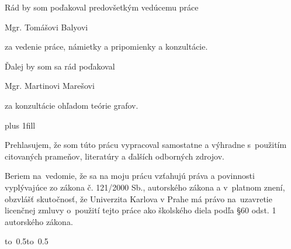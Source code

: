 \documentclass[12pt,a4paper]{report}
\let\openright=\clearpage
\begin{document}
\openright

\noindent

\begin{center}

\vspace{50mm}
Rád by som poďakoval predovšetkým vedúcemu práce

\vspace{5mm}
Mgr. Tomášovi Balyovi
\vspace{5mm}

za vedenie práce, námietky a pripomienky a konzultácie.


\vspace{30mm}
Ďalej by som sa rád poďakoval 

\vspace{5mm}
Mgr. Martinovi Marešovi 
\vspace{5mm}

za konzultácie ohľadom teórie grafov.
\end{center}



\newpage


\vglue 0pt plus 1fill

\noindent
Prehlasujem, že som túto prácu vypracoval samostatne a výhradne
s~použitím citovaných prameňov, literatúry a ďalších
odborných zdrojov.


\medskip\noindent
Beriem na~vedomie, že sa na moju prácu vzťahujú práva
a povinnosti vyplývajúce zo zákona  č. 121/2000 Sb.,
autorského zákona a v~platnom znení, obzvlášť skutočnosť,
že Univerzita Karlova v Prahe má právo na~uzavretie licenčnej zmluvy o~použití tejto práce ako školského diela podľa
§60 odst. 1 autorského zákona.

\vspace{10mm}

\hbox{\hbox to 0.5\hbox to 0.5}

\vspace{20mm}
\newpage

\end{document}
